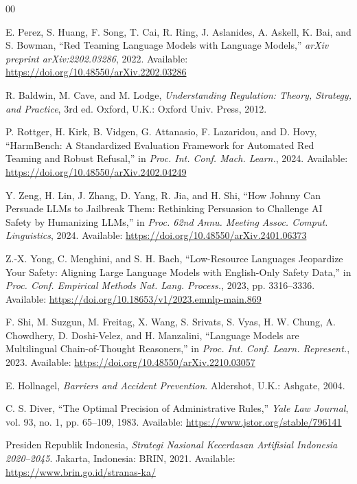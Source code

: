 \documentclass[conference]{IEEEtran}
\begin{document}
\begin{thebibliography}{00}

 E. Perez, S. Huang, F. Song, T. Cai, R. Ring, J. Aslanides, A. Askell, K. Bai, and S. Bowman, ``Red Teaming Language Models with Language Models,'' \textit{arXiv preprint arXiv:2202.03286}, 2022. Available: \url{https://doi.org/10.48550/arXiv.2202.03286}

 R. Baldwin, M. Cave, and M. Lodge, \textit{Understanding Regulation: Theory, Strategy, and Practice}, 3rd ed. Oxford, U.K.: Oxford Univ. Press, 2012.

 P. Rottger, H. Kirk, B. Vidgen, G. Attanasio, F. Lazaridou, and D. Hovy, ``HarmBench: A Standardized Evaluation Framework for Automated Red Teaming and Robust Refusal,'' in \textit{Proc. Int. Conf. Mach. Learn.}, 2024. Available: \url{https://doi.org/10.48550/arXiv.2402.04249}

 Y. Zeng, H. Lin, J. Zhang, D. Yang, R. Jia, and H. Shi, ``How Johnny Can Persuade LLMs to Jailbreak Them: Rethinking Persuasion to Challenge AI Safety by Humanizing LLMs,'' in \textit{Proc. 62nd Annu. Meeting Assoc. Comput. Linguistics}, 2024. Available: \url{https://doi.org/10.48550/arXiv.2401.06373}

 Z.-X. Yong, C. Menghini, and S. H. Bach, ``Low-Resource Languages Jeopardize Your Safety: Aligning Large Language Models with English-Only Safety Data,'' in \textit{Proc. Conf. Empirical Methods Nat. Lang. Process.}, 2023, pp. 3316--3336. Available: \url{https://doi.org/10.18653/v1/2023.emnlp-main.869}

 F. Shi, M. Suzgun, M. Freitag, X. Wang, S. Srivats, S. Vyas, H. W. Chung, A. Chowdhery, D. Doshi-Velez, and H. Manzalini, ``Language Models are Multilingual Chain-of-Thought Reasoners,'' in \textit{Proc. Int. Conf. Learn. Represent.}, 2023. Available: \url{https://doi.org/10.48550/arXiv.2210.03057}

 E. Hollnagel, \textit{Barriers and Accident Prevention}. Aldershot, U.K.: Ashgate, 2004.

 C. S. Diver, ``The Optimal Precision of Administrative Rules,'' \textit{Yale Law Journal}, vol. 93, no. 1, pp. 65--109, 1983. Available: \url{https://www.jstor.org/stable/796141}

 Presiden Republik Indonesia, \textit{Strategi Nasional Kecerdasan Artifisial Indonesia 2020--2045}. Jakarta, Indonesia: BRIN, 2021. Available: \url{https://www.brin.go.id/stranas-ka/}


\end{thebibliography}
\end{document}
